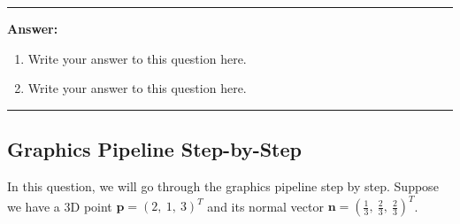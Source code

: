 \documentclass[conference]{styles/acmsiggraph}
\renewcommand{\vec}[1]{\mathbf{#1}}
\newenvironment{answer}{}{}
\newcommand{\points}[1]{\hfill \normalfont{(\textit{#1pts})}}
\begin{document}

\begin{answer}
	\rule{\textwidth}{0.4pt}
	\textbf{Answer:}
	\begin{enumerate}[label=(\roman*)]
		\item Write your answer to this question here.
		\item Write your answer to this question here.
	\end{enumerate}
	\rule{\textwidth}{0.4pt}
\end{answer}

\newpage
\subsection{Graphics Pipeline Step-by-Step \points{20}}

In this question, we will go through the graphics pipeline step by step. Suppose we have a 3D point $\vec{p} = (2,\ 1,\ 3)^T$ and its normal vector $\vec{n} = (\frac{1}{3},\ \frac{2}{3},\ \frac{2}{3})^T$.
\end{document}

